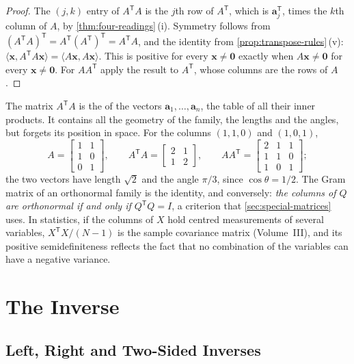 \begin{proof}
The $(j,k)$ entry of $A^{\mathsf T}A$ is the $j$th row of $A^{\mathsf T}$, which is $\mathbf a_j^{\mathsf T}$, times the $k$th column of $A$, by \cref{thm:four-readings}\,(i). Symmetry follows from $(A^{\mathsf T}A)^{\mathsf T}=A^{\mathsf T}(A^{\mathsf T})^{\mathsf T}=A^{\mathsf T}A$, and the identity from \cref{prop:transpose-rules}\,(v): $\langle\mathbf x,A^{\mathsf T}A\mathbf x\rangle=\langle A\mathbf x,A\mathbf x\rangle$. This is positive for every $\mathbf x\ne\mathbf 0$ exactly when $A\mathbf x\ne\mathbf 0$ for every $\mathbf x\ne\mathbf 0$. For $AA^{\mathsf T}$ apply the result to $A^{\mathsf T}$, whose columns are the rows of $A$.
\end{proof}

The matrix $A^{\mathsf T}A$ is the  of the vectors $\mathbf a_1,\ldots,\mathbf a_n$, the table of all their inner products. It contains all the geometry of the family, the lengths and the angles, but forgets its position in space. For the columns $(1,1,0)$ and $(1,0,1)$,
\[
A=\begin{bmatrix}1&1\\1&0\\0&1\end{bmatrix},\qquad A^{\mathsf T}A=\begin{bmatrix}2&1\\1&2\end{bmatrix},\qquad AA^{\mathsf T}=\begin{bmatrix}2&1&1\\1&1&0\\1&0&1\end{bmatrix};
\]
the two vectors have length $\sqrt2$ and the angle $\pi/3$, since $\cos\theta=1/2$. The Gram matrix of an orthonormal family is the identity, and conversely: \emph{the columns of $Q$ are orthonormal if and only if $Q^{\mathsf T}Q=I$}, a criterion that \cref{sec:special-matrices} uses. In statistics, if the columns of $X$ hold centred measurements of several variables, $X^{\mathsf T}X/(N-1)$ is the sample covariance matrix (Volume~III), and its positive semidefiniteness reflects the fact that no combination of the variables can have a negative variance.

\section{The Inverse}
\label{sec:inverse}

\subsection{Left, Right and Two-Sided Inverses}

